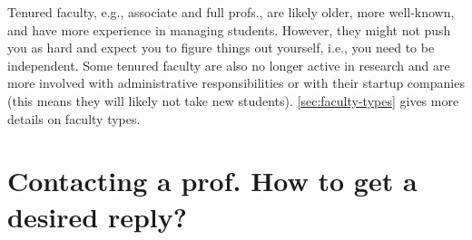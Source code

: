 \documentclass[oneside,11pt,dvipsnames]{book}
\newenvironment{commentbox}[1][]{
  \small
  \begin{mybox}
    {\small \textbf{#1}}
  }{
  \end{mybox}
}
\begin{document}
Tenured faculty, e.g., associate and full profs., are likely older, more well-known, and have more experience in managing students.  However, they might not push you as hard and expect you to figure things out yourself, i.e., you need to be independent.  Some tenured faculty are also no longer active in research and are more involved with administrative responsibilities or with their startup companies (this means they will likely not take new students). \autoref{sec:faculty-types} gives more details on faculty types.




\section{Contacting a prof. How to get a desired reply?}\label{sec:contact}
\end{document}
